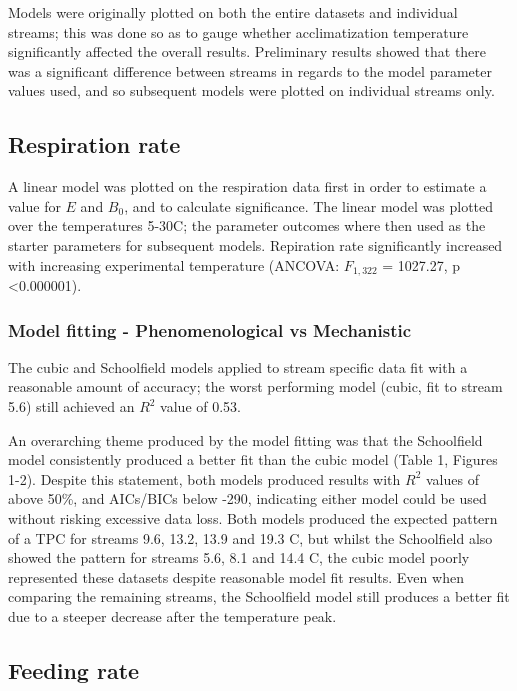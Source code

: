 \documentclass[../../Paper.tex]{subfiles}
\begin{document}
Models were originally plotted on both the entire datasets and individual streams; this
was done so as to gauge whether acclimatization temperature significantly affected the overall
results.
Preliminary results showed that there was a significant difference between 
streams in regards to the model parameter values used, and so subsequent models were plotted
on individual streams only. 

\subsection*{Respiration rate}
A linear model was plotted on the respiration data first in order to estimate a value for $E$ and $B_0$, and to calculate significance. 
The linear model was plotted over the temperatures 5-30\degree C; the parameter 
outcomes where then used as the starter parameters for subsequent models. Repiration rate significantly increased with
increasing experimental temperature (ANCOVA: $F_{1,322}$ = 1027.27, p \textless  0.000001).

\subsubsection*{Model fitting - Phenomenological vs Mechanistic}

The cubic and Schoolfield models applied to stream specific data fit with a
reasonable amount of accuracy; the worst performing model (cubic, fit to stream 5.6) 
still achieved an $R^2$ value of 0.53. 

An overarching theme produced by the model
fitting was that the Schoolfield model consistently produced a better fit than
the cubic model (Table 1, Figures 1-2). Despite  this statement, both models produced results
with $R^2$ values of above 50\%, and AICs/BICs below -290, indicating either model could be
used without risking excessive data loss. Both models produced the expected pattern of a TPC
for streams 9.6, 13.2, 13.9 and 19.3 \degree C, but whilst the Schoolfield also showed the pattern
for streams 5.6, 8.1 and 14.4 \degree C, the cubic model poorly represented these
datasets despite reasonable model fit results. Even when comparing the remaining
streams, the Schoolfield model still produces a better fit due to a steeper decrease after
the temperature peak. 

\subsection*{Feeding rate}
\end{document}

